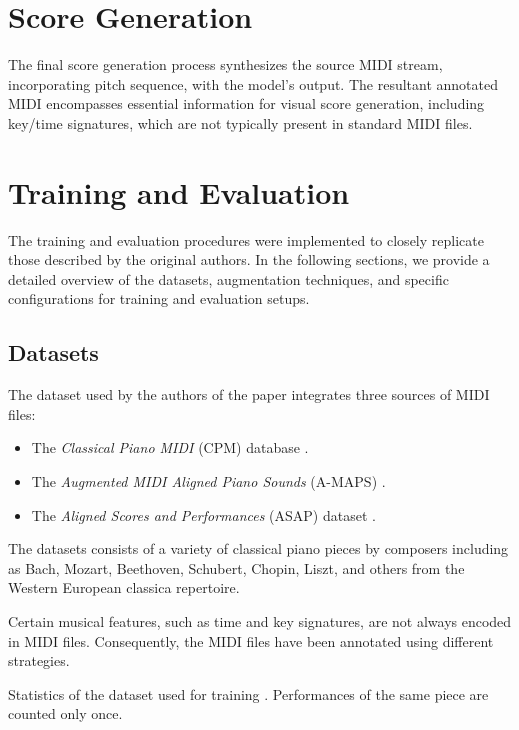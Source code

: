 \section{Score Generation}

The final score generation process synthesizes the source MIDI stream, incorporating pitch sequence, with the model's output. The resultant annotated MIDI encompasses essential information for visual score generation, including key/time signatures, which are not typically present in standard MIDI files.

\section{Training and Evaluation}

The training and evaluation procedures were implemented to closely replicate those described by the original authors. In the following sections, we provide a detailed overview of the datasets, augmentation techniques, and specific configurations for training and evaluation setups.

\subsection{Datasets}\label{datasets}

The dataset used by the authors of the paper \cite{Liu2022} integrates three sources of MIDI files: \begin{itemize}
	\item The \emph{Classical Piano MIDI} (CPM) database \cite{Krueger1996}.
	\item The \emph{Augmented MIDI Aligned Piano Sounds} (A-MAPS) \cite{Ycart2018}.
	\item The \emph{Aligned Scores and Performances} (ASAP) dataset \cite{Foscarin2020}.
\end{itemize}

The datasets consists of a variety of classical piano pieces by composers including as Bach, Mozart, Beethoven, Schubert, Chopin, Liszt, and others from the Western European classica repertoire.

Certain musical features, such as time and key signatures, are not always encoded in MIDI files. Consequently, the MIDI files have been annotated using different strategies.

\begin{table}[ht!]
\centering

\caption[Statistics of the dataset used for training.]{Statistics of the dataset used for training \cite{Liu2022}. Performances of the same piece are counted only once.}
\label{train_valid_test}
\end{table}

